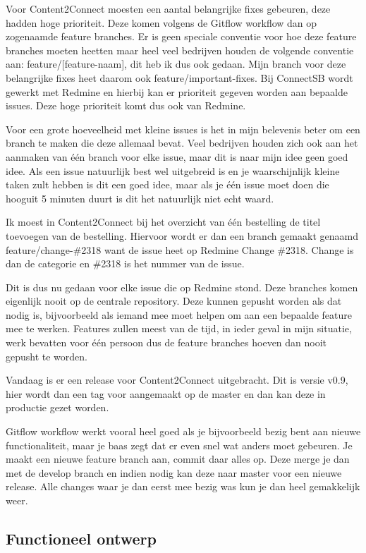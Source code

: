 \newline

Voor Content2Connect moesten een aantal belangrijke fixes gebeuren, deze hadden hoge prioriteit. Deze komen volgens de Gitflow workflow dan op zogenaamde feature branches. Er is geen speciale conventie voor hoe deze feature branches moeten heetten maar heel veel bedrijven houden de volgende conventie aan: feature/[feature-naam], dit heb ik dus ook gedaan. Mijn branch voor deze belangrijke fixes heet daarom ook feature/important-fixes. Bij ConnectSB wordt gewerkt met Redmine en hierbij kan er prioriteit gegeven worden aan bepaalde issues. Deze hoge prioriteit komt dus ook van Redmine.

Voor een grote hoeveelheid met kleine issues is het in mijn belevenis beter om een branch te maken die deze allemaal bevat. Veel bedrijven houden zich ook aan het aanmaken van één branch voor elke issue, maar dit is naar mijn idee geen goed idee. Als een issue natuurlijk best wel uitgebreid is en je waarschijnlijk kleine taken zult hebben is dit een goed idee, maar als je één issue moet doen die hooguit 5 minuten duurt is dit het natuurlijk niet echt waard.

\newline

Ik moest in Content2Connect bij het overzicht van één bestelling de titel toevoegen van de bestelling. Hiervoor wordt er dan een branch gemaakt genaamd feature/change-\#2318 want de issue heet op Redmine Change \#2318. Change is dan de categorie en \#2318 is het nummer van de issue.

Dit is dus nu gedaan voor elke issue die op Redmine stond. Deze branches komen eigenlijk nooit op de centrale repository. Deze kunnen gepusht worden als dat nodig is, bijvoorbeeld als iemand mee moet helpen om aan een bepaalde feature mee te werken. Features zullen meest van de tijd, in ieder geval in mijn situatie, werk bevatten voor één persoon dus de feature branches hoeven dan nooit gepusht te worden.

\newline

Vandaag is er een release voor Content2Connect uitgebracht. Dit is versie v0.9, hier wordt dan een tag voor aangemaakt op de master en dan kan deze in productie gezet worden.

Gitflow workflow werkt vooral heel goed als je bijvoorbeeld bezig bent aan nieuwe functionaliteit, maar je baas zegt dat er even snel wat anders moet gebeuren. Je maakt een nieuwe feature branch aan, commit daar alles op. Deze merge je dan met de develop branch en indien nodig kan deze naar master voor een nieuwe release. Alle changes waar je dan eerst mee bezig was kun je dan heel gemakkelijk weer.

\clearpage

\subsection{Functioneel ontwerp}

